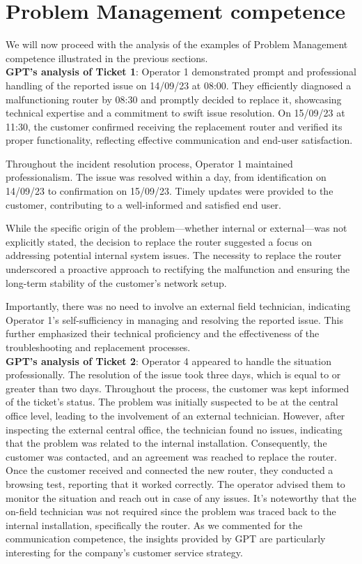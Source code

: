 \section{Problem Management competence}

We will now proceed with the analysis of the examples of Problem Management competence illustrated in the previous sections.\\

\textbf{GPT's analysis of Ticket 1}: Operator 1 demonstrated prompt and professional handling of the reported issue on 14/09/23 at 08:00. They efficiently diagnosed a malfunctioning router by 08:30 and promptly decided to replace it, showcasing technical expertise and a commitment to swift issue resolution. On 15/09/23 at 11:30, the customer confirmed receiving the replacement router and verified its proper functionality, reflecting effective communication and end-user satisfaction.

Throughout the incident resolution process, Operator 1 maintained professionalism. The issue was resolved within a day, from identification on 14/09/23 to confirmation on 15/09/23. Timely updates were provided to the customer, contributing to a well-informed and satisfied end user.

While the specific origin of the problem—whether internal or external—was not explicitly stated, the decision to replace the router suggested a focus on addressing potential internal system issues. The necessity to replace the router underscored a proactive approach to rectifying the malfunction and ensuring the long-term stability of the customer's network setup.

Importantly, there was no need to involve an external field technician, indicating Operator 1's self-sufficiency in managing and resolving the reported issue. This further emphasized their technical proficiency and the effectiveness of the troubleshooting and replacement processes.\\

\textbf{GPT's analysis of Ticket 2}: Operator 4 appeared to handle the situation professionally. The resolution of the issue took three days, which is equal to or greater than two days. Throughout the process, the customer was kept informed of the ticket's status. The problem was initially suspected to be at the central office level, leading to the involvement of an external technician. However, after inspecting the external central office, the technician found no issues, indicating that the problem was related to the internal installation. Consequently, the customer was contacted, and an agreement was reached to replace the router. Once the customer received and connected the new router, they conducted a browsing test, reporting that it worked correctly. The operator advised them to monitor the situation and reach out in case of any issues. It's noteworthy that the on-field technician was not required since the problem was traced back to the internal installation, specifically the router. As we commented for the communication competence, the insights provided by GPT are particularly interesting for the company's customer service strategy.\\

